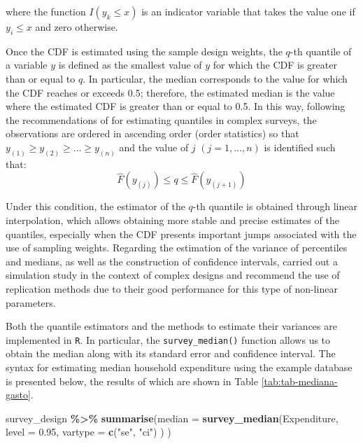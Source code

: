 \documentclass[
  english,
  12pt,
]{book}
\newenvironment{Shaded}{\begin{snugshade}}{\end{snugshade}}
\newcommand{\AttributeTok}[1]{\textcolor[rgb]{0.13,0.29,0.53}{#1}}
\newcommand{\FloatTok}[1]{\textcolor[rgb]{0.00,0.00,0.81}{#1}}
\newcommand{\FunctionTok}[1]{\textcolor[rgb]{0.13,0.29,0.53}{\textbf{#1}}}
\newcommand{\NormalTok}[1]{#1}
\newcommand{\SpecialCharTok}[1]{\textcolor[rgb]{0.81,0.36,0.00}{\textbf{#1}}}
\newcommand{\StringTok}[1]{\textcolor[rgb]{0.31,0.60,0.02}{#1}}
\begin{document}
where the function \(I\left(y_{k}\leq x\right)\) is an indicator variable that takes the value one if \(y_i \leq x\) and zero otherwise.

Once the CDF is estimated using the sample design weights, the \(q\)-th quantile of a variable \(y\) is defined as the smallest value of \(y\) for which the CDF is greater than or equal to \(q\). In particular, the median corresponds to the value for which the CDF reaches or exceeds 0.5; therefore, the estimated median is the value where the estimated CDF is greater than or equal to 0.5. In this way, following the recommendations of \citet{heeringa2017applied} for estimating quantiles in complex surveys, the observations are ordered in ascending order (order statistics) so that \(y_{(1)} \geq y_{(2)} \geq  \ldots \geq y_{(n)}\) and the value of \(j\) \((j=1,\ldots,n)\) is identified such that:
\[
\hat{F}\left(y_{(j)}\right)\leq q\leq\hat{F}\left(y_{(j+1)}\right)
\]

Under this condition, the estimator of the \(q\)-th quantile is obtained through linear interpolation, which allows obtaining more stable and precise estimates of the quantiles, especially when the CDF presents important jumps associated with the use of sampling weights. Regarding the estimation of the variance of percentiles and medians, as well as the construction of confidence intervals, \citet{kovar1988} carried out a simulation study in the context of complex designs and recommend the use of replication methods due to their good performance for this type of non-linear parameters.

Both the quantile estimators and the methods to estimate their variances are implemented in \texttt{R}. In particular, the \texttt{survey\_median()} function allows us to obtain the median along with its standard error and confidence interval. The syntax for estimating median household expenditure using the example database is presented below, the results of which are shown in Table \ref{tab:tab-mediana-gasto}.

\begin{Shaded}
\begin{Highlighting}[]
\NormalTok{survey\_design }\SpecialCharTok{\%\textgreater{}\%}
  \FunctionTok{summarise}\NormalTok{(}\AttributeTok{median =} \FunctionTok{survey\_median}\NormalTok{(Expenditure,}
                                    \AttributeTok{level =} \FloatTok{0.95}\NormalTok{,}
                                    \AttributeTok{vartype =} \FunctionTok{c}\NormalTok{(}\StringTok{"se"}\NormalTok{, }\StringTok{"ci"}\NormalTok{)}
\NormalTok{                                    )}
\NormalTok{            )}
\end{Highlighting}
\end{Shaded}
\end{document}
